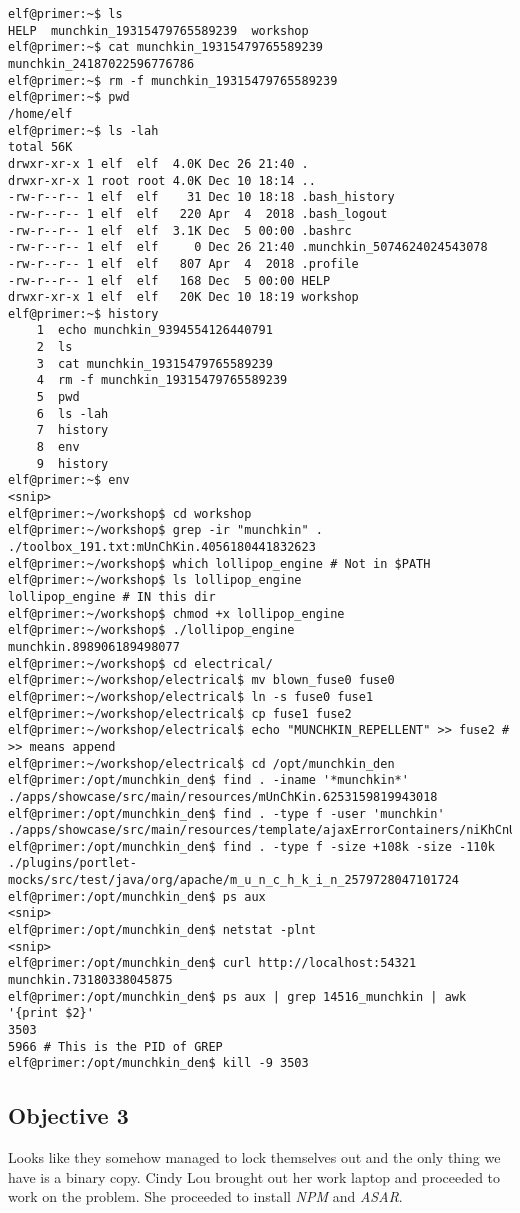 \begin{verbatim}
elf@primer:~$ ls
HELP  munchkin_19315479765589239  workshop
elf@primer:~$ cat munchkin_19315479765589239
munchkin_24187022596776786
elf@primer:~$ rm -f munchkin_19315479765589239
elf@primer:~$ pwd
/home/elf
elf@primer:~$ ls -lah
total 56K
drwxr-xr-x 1 elf  elf  4.0K Dec 26 21:40 .
drwxr-xr-x 1 root root 4.0K Dec 10 18:14 ..
-rw-r--r-- 1 elf  elf    31 Dec 10 18:18 .bash_history
-rw-r--r-- 1 elf  elf   220 Apr  4  2018 .bash_logout
-rw-r--r-- 1 elf  elf  3.1K Dec  5 00:00 .bashrc
-rw-r--r-- 1 elf  elf     0 Dec 26 21:40 .munchkin_5074624024543078
-rw-r--r-- 1 elf  elf   807 Apr  4  2018 .profile
-rw-r--r-- 1 elf  elf   168 Dec  5 00:00 HELP
drwxr-xr-x 1 elf  elf   20K Dec 10 18:19 workshop
elf@primer:~$ history
    1  echo munchkin_9394554126440791
    2  ls
    3  cat munchkin_19315479765589239
    4  rm -f munchkin_19315479765589239
    5  pwd
    6  ls -lah
    7  history
    8  env
    9  history
elf@primer:~$ env
<snip>
elf@primer:~/workshop$ cd workshop
elf@primer:~/workshop$ grep -ir "munchkin" .
./toolbox_191.txt:mUnChKin.4056180441832623
elf@primer:~/workshop$ which lollipop_engine # Not in $PATH
elf@primer:~/workshop$ ls lollipop_engine
lollipop_engine # IN this dir
elf@primer:~/workshop$ chmod +x lollipop_engine
elf@primer:~/workshop$ ./lollipop_engine
munchkin.898906189498077
elf@primer:~/workshop$ cd electrical/
elf@primer:~/workshop/electrical$ mv blown_fuse0 fuse0
elf@primer:~/workshop/electrical$ ln -s fuse0 fuse1
elf@primer:~/workshop/electrical$ cp fuse1 fuse2
elf@primer:~/workshop/electrical$ echo "MUNCHKIN_REPELLENT" >> fuse2 # >> means append
elf@primer:~/workshop/electrical$ cd /opt/munchkin_den
elf@primer:/opt/munchkin_den$ find . -iname '*munchkin*'
./apps/showcase/src/main/resources/mUnChKin.6253159819943018
elf@primer:/opt/munchkin_den$ find . -type f -user 'munchkin'
./apps/showcase/src/main/resources/template/ajaxErrorContainers/niKhCnUm_9528909612014411
elf@primer:/opt/munchkin_den$ find . -type f -size +108k -size -110k
./plugins/portlet-mocks/src/test/java/org/apache/m_u_n_c_h_k_i_n_2579728047101724
elf@primer:/opt/munchkin_den$ ps aux
<snip>
elf@primer:/opt/munchkin_den$ netstat -plnt
<snip>
elf@primer:/opt/munchkin_den$ curl http://localhost:54321
munchkin.73180338045875
elf@primer:/opt/munchkin_den$ ps aux | grep 14516_munchkin | awk '{print $2}'
3503
5966 # This is the PID of GREP
elf@primer:/opt/munchkin_den$ kill -9 3503
\end{verbatim}

\subsection{Objective 3}
Looks like they somehow managed to lock themselves out and the only thing we have is a binary copy.
Cindy Lou brought out her work laptop and proceeded to work on the problem.
She proceeded to install \textit{NPM} and \textit{ASAR}.

